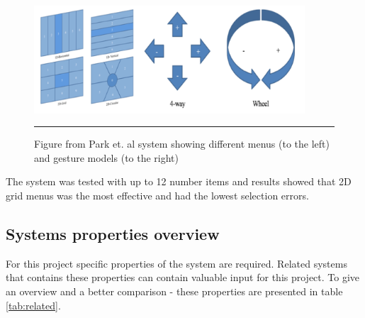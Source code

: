 \begin{figure}[htbp]
	\centering
		\includegraphics[width=0.9\textwidth,height=\textheight,keepaspectratio]{./Figures/park-menus.png}
		\rule{35em}{0.5pt}
	\caption[Park menus]{Figure from Park et. al \cite{park_gaze-directed_2011} system showing different menus (to the left) and gesture models (to the right)}
	\label{fig:park-menus}
\end{figure}

The system was tested with up to 12 number items and results showed that 2D grid menus was the most effective and had the lowest selection errors.


\subsection{Systems properties overview}
For this project specific properties of the system are required. Related systems that contains these properties can contain valuable input for this project. To give an overview and a better comparison - these properties are presented in table \ref{tab:related}.

